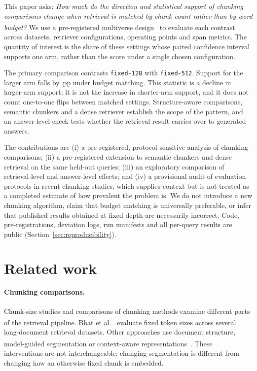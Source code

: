 \documentclass[11pt]{article}
\newcommand{\pp}{\ensuremath{\,\mathrm{pp}}}
\newcommand{\chunk}[1]{\texttt{#1}}
\newcommand{\citeL}[1]{\cite{#1}\textsuperscript{\textcolor{red}{\dag}}}
\begin{document}
This paper asks: \emph{How much do the direction and statistical support of chunking comparisons change when
retrieval is matched by chunk count rather than by word budget?} We use a pre-registered multiverse
design~\citeL{steegen2016multiverse} to evaluate each contrast across datasets, retriever configurations, operating
points and span metrics. The quantity of interest is the share of these settings whose paired confidence interval
supports one arm, rather than the score under a single chosen configuration.

The primary comparison contrasts \chunk{fixed-128} with \chunk{fixed-512}. Support for the larger arm falls by
\HOneEst\pp{} under budget matching. This statistic is a decline in larger-arm support; it is not the increase in
shorter-arm support, and it does not count one-to-one flips between matched settings. Structure-aware comparisons,
semantic chunkers and a dense retriever establish the scope of the pattern, and an answer-level check tests whether
the retrieval result carries over to generated answers.

The contributions are (i) a pre-registered, protocol-sensitive analysis of chunking comparisons; (ii) a
pre-registered extension to semantic chunkers and dense retrieval on the same held-out queries; (iii) an exploratory
comparison of retrieval-level and answer-level effects; and (iv) a provisional audit of evaluation protocols in
recent chunking studies, which supplies context but is not treated as a completed estimate of how prevalent the
problem is. We do not introduce a new chunking algorithm, claim that budget matching is universally preferable, or
infer that published results obtained at fixed depth are necessarily incorrect. Code, pre-registrations, deviation
logs, run manifests and all per-query results are public (Section~\ref{sec:reproducibility}).

\section{Related work}\label{sec:related}
\paragraph{Chunking comparisons.}
Chunk-size studies and comparisons of chunking methods examine different parts of the retrieval pipeline. Bhat et
al.~\citeL{bhat2025chunksize} evaluate fixed token sizes across several long-document retrieval datasets. Other
approaches use document structure, model-guided segmentation or context-aware
representations~\citeL{jimenoyepes2024financial,duarte2024lumberchunker,gunther2024latechunking}. These interventions
are not interchangeable: changing segmentation is different from changing how an otherwise fixed chunk is embedded.
\end{document}
